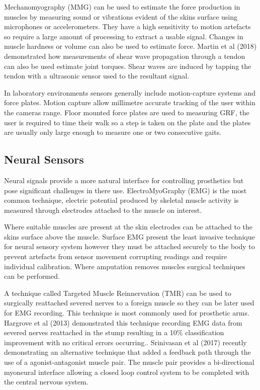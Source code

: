 Mechanomyography (MMG) can be used to estimate the force production in muscles by measuring sound or vibrations evident of the skins surface using microphones or accelerometers. They have a high sensitivity to motion artefacts so require a large amount of processing to extract a usable signal. Changes in muscle hardness or volume can also be used to estimate force.\cite{Tucker2015} Martin et al (2018) demonstrated how measurements of shear wave propagation through a tendon can also be used estimate joint torques. Shear waves are induced by tapping the tendon with a ultrasonic sensor used to the resultant signal\cite{Martin2018}.

In laboratory environments sensors generally include motion-capture systems and force plates. Motion capture allow millimetre accurate tracking of the user within the cameras range. Floor mounted force plates are used to measuring GRF, the user is required to time their walk so a step is taken on the plate and the plates are usually only large enough to measure one or two consecutive gaits.

\subsection{Neural Sensors}
Neural signals provide a more natural interface for controlling prosthetics but pose significant challenges in there use. ElectroMyoGraphy (EMG) is the most common technique, electric potential produced by skeletal muscle activity is measured through electrodes attached to the muscle on interest.

Where suitable muscles are present at the skin electrodes can be attached to the skins surface above the muscle. Surface EMG present the least invasive technique for neural sensory system however they must be attached securely to the body to prevent artefacts from sensor movement corrupting readings and require individual calibration. Where amputation removes muscles surgical techniques can be performed.

A technique called Targeted Muscle Reinnervation (TMR) can be used to surgically reattached  severed nerves to a foreign muscle so they can be later used for EMG recording. This technique is most commonly used for prosthetic arms\cite{TMR2018}. Hargrove et al (2013) demonstrated this technique recording EMG data from severed nerves reattached in the stump resulting in a 10\% classification improvement with no critical errors occurring.\cite{Hargrove2013}. Srinivasan et al (2017) recently demonstrating an alternative technique that added a feedback path through the use of a agonist-antagonist muscle pair. The muscle pair provides a bi-directional myoneural interface allowing a closed loop control system to be completed with the central nervous system.\cite{Srinivasan2017} 

